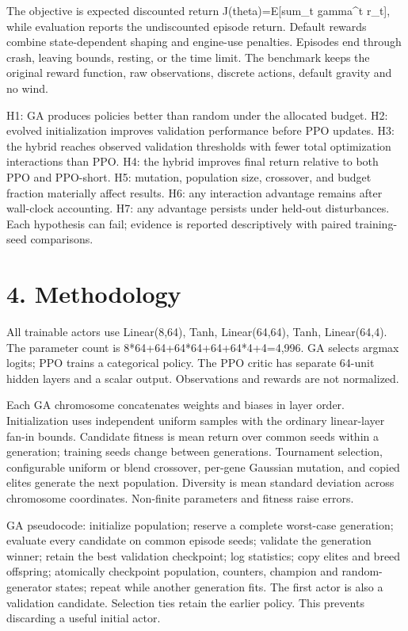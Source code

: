 \documentclass[11pt,a4paper]{article}
\begin{document}
The objective is expected discounted return J(theta)=E[sum\_t gamma\textasciicircum{}t r\_t], while evaluation reports the undiscounted episode return. Default rewards combine state-dependent shaping and engine-use penalties. Episodes end through crash, leaving bounds, resting, or the time limit. The benchmark keeps the original reward function, raw observations, discrete actions, default gravity and no wind.

H1: GA produces policies better than random under the allocated budget. H2: evolved initialization improves validation performance before PPO updates. H3: the hybrid reaches observed validation thresholds with fewer total optimization interactions than PPO. H4: the hybrid improves final return relative to both PPO and PPO-short. H5: mutation, population size, crossover, and budget fraction materially affect results. H6: any interaction advantage remains after wall-clock accounting. H7: any advantage persists under held-out disturbances. Each hypothesis can fail; evidence is reported descriptively with paired training-seed comparisons.

\section*{4. Methodology}
All trainable actors use Linear(8,64), Tanh, Linear(64,64), Tanh, Linear(64,4). The parameter count is 8*64+64+64*64+64+64*4+4=4,996. GA selects argmax logits; PPO trains a categorical policy. The PPO critic has separate 64-unit hidden layers and a scalar output. Observations and rewards are not normalized.

Each GA chromosome concatenates weights and biases in layer order. Initialization uses independent uniform samples with the ordinary linear-layer fan-in bounds. Candidate fitness is mean return over common seeds within a generation; training seeds change between generations. Tournament selection, configurable uniform or blend crossover, per-gene Gaussian mutation, and copied elites generate the next population. Diversity is mean standard deviation across chromosome coordinates. Non-finite parameters and fitness raise errors.

GA pseudocode: initialize population; reserve a complete worst-case generation; evaluate every candidate on common episode seeds; validate the generation winner; retain the best validation checkpoint; log statistics; copy elites and breed offspring; atomically checkpoint population, counters, champion and random-generator states; repeat while another generation fits. The first actor is also a validation candidate. Selection ties retain the earlier policy. This prevents discarding a useful initial actor.
\end{document}
